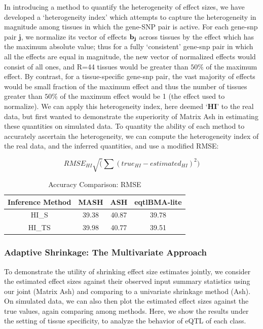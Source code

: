 In introducing a method to quantify the heterogeneity of effect sizes, we have developed a `heterogeneity index' which attempts to capture the heterogeneity in magnitude among tissues in which the gene-SNP pair is active. For each gene-snp pair $\textbf{j}$, we normalize its vector of effects $\bf{b_{j}}$ across tissues by the effect which has the maximum absolute value; thus for a fully `consistent' gene-snp pair in which all the effects are equal in magnitude, the new vector of normalized effects would consist of all ones, and R=44 tissues would be greater than $50\%$ of the maximum effect. By contrast, for a tissue-specific gene-snp pair, the vast majority of effects would be small fraction of the maximum effect and thus the number of tissues greater than $50\%$ of the maximum effect would be 1 (the effect used to normalize). We can apply this heterogeneity index, here deemed $\textbf{`HI'}$ to the real data, but first wanted to demonstrate the superiority of Matrix Ash in estimating these quantities on simulated data. To quantity the ability of each method to accurately ascertain the heterogeneity, we can compute the heterogeneity index of the real data, and the inferred quantities, and use a modified RMSE:

\begin{equation}
RMSE_{HI} \sqrt(\sum(true_{HI}-estimated_{HI})^2)
\end{equation}

\begin{table}[ht]
\caption{Accuracy Comparison: RMSE}
\centering
\begin{tabular}{c c c c}
\hline\hline
Inference Method & MASH & ASH & eqtlBMA-lite \\ [0.5ex] %
\hline
HI_{S}&39.38 &40.87 &39.78 \\
HI_{TS}& 39.98& 40.77&39.51\\
\hline
\end{tabular}
\label{table:HETindex}
\end{table}

\subsubsection{Adaptive Shrinkage: The Multivariate Approach}

To demonstrate the utility of shrinking effect size estimates jointly, we consider the estimated effect sizes against their observed input summary statistics using our joint (Matrix Ash) and comparing to a univariate shrinkage method (Ash). On simulated data, we can also then plot the estimated effect sizes against the true values,  again comparing among methods. Here, we show the results under the setting of tissue specificity, to analyze the behavior of eQTL of each class.\newline

